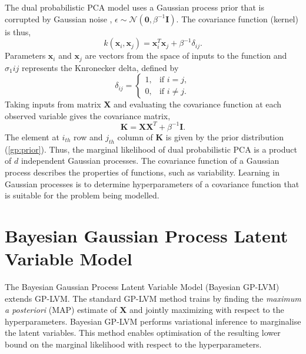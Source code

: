 \documentclass[ %
author={Dillon Keith Diep},
supervisor={Dr. Carl Henrik Ek},
degree={MEng},
title={ART-CG Hair:},
subtitle={Assisted Real-time Content Generation of Stylised Virtual Hair},
type={Research},
year={2017} ]{dissertation}
\begin{document}
The dual probabilistic PCA model uses a Gaussian process prior that is corrupted by Gaussian noise \cite{gplvm}, $\epsilon\sim\mathcal{N}(\bm{0},\beta^{-1}\bm{I})$.
The covariance function (kernel) is thus,
\begin{equation} \label{gp:prior}
k(\bm{x}_i,\bm{x}_j)=\bm{x}^T_i\bm{x}_j+\beta^{-1}\delta_{ij}.
\end{equation}
Parameters $\bm{x}_i$ and $\bm{x}_j$ are vectors from the space of inputs to the function and $\sigma_1{ij}$ represents the Knronecker delta, defined by 
$$
\delta_{ij} =
\begin{cases}
1, &         \text{if } i=j,\\
0, &         \text{if } i\neq j.
\end{cases}
$$
Taking inputs from matrix $\bm{X}$ and evaluating the covariance function at each observed variable gives the covariance matrix,
$$\bm{K=XX}^T+\beta^{-1}\bm{I}.$$
The element at $i_{th}$ row and $j_{th}$ column of $\bm{K}$ is given by the prior distribution (\ref{gp:prior}). Thus, the marginal likelihood of dual probabilistic PCA is a product of $d$ independent Gaussian processes. The covariance function of a Gaussian process describes the properties of functions, such as variability. Learning in Gaussian processes is to determine hyperparameters of a covariance function that is suitable for the problem being modelled.

\section{Bayesian Gaussian Process Latent Variable Model}
The Bayesian Gaussian Process Latent Variable Model (Bayesian GP-LVM) \cite{bgplvm} extends GP-LVM. The standard GP-LVM method trains by finding the \textit{maximum a posteriori} (MAP) estimate of $\bm{X}$ and jointly maximizing with respect to the hyperparameters. Bayesian GP-LVM performs variational inference to marginalise the latent variables. This method enables optimisation of the resulting lower bound on the marginal likelihood with respect to the hyperparameters. 
\end{document}
